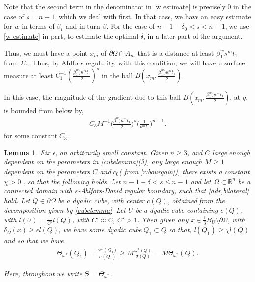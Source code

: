 \documentclass{article}
\newcounter{lem}
\theoremstyle{plain}
\theoremstyle{plain}
\newcommand{\eps}{\epsilon}
\newcommand{\en}{\beta_1}
\newtheorem{lemma}[theorem]{Lemma}
\theoremstyle{definition}
\theoremstyle{plain}
\begin{document}
Note that the second term in the denominator in \cref{w estimate} is precisely $0$ in the case of $s=n-1$, which we deal with first. In that case, we have an easy estimate for $w$ in terms of $\en$ and in turn $\beta$.  For the case of $n-1-\delta_0 <s<n-1$, we use \cref{w estimate} in part, to estimate the optimal $\delta$, in a later part of the argument.
 
      Thus, we must have  a point $x_m$ of $\partial\Omega\cap A_m$ that is a distance at least $\beta_1^w \kappa^m t_1$ from $\Sigma_1$. Thus, by Ahlfors regularity, with this condition, we will have a surface measure at least $C_{1}^{-1}(\frac{\beta_1^w)\kappa^m t_1}{2})^s$ in the ball $B(x_m, \frac{\beta_1^w)\kappa^m t_1}{2})$. 
 

      In this case, the magnitude of the gradient due to this ball $B(x_m, \frac{\beta_1^w)\kappa^m t_1}{2})$, at $q$, is bounded from below by, 
      \begin{align}\label{lowerbound}
          C_{3}M^{-1}\Big(\frac{\beta_1^w)\kappa^m t_1}{2}\Big)^s \Big(\frac{1}{\kappa^m t_1}\Big)^{n-1}.
      \end{align}
      for some constant $C_3$. 

  
     \begin{lemma}\label{lemma9}
Fix $\eps$, an arbitrarily small constant. Given $n\geq 3$, and $C$ large enough dependent on the parameters in \cref{cubelemma}(3), any large enough $M\geq 1$ dependent on the parameters $C$ and $c_0$( from \cref{r:bourgain}), there exists a constant $\chi>0$ , so that the following holds.
Let $n-1-\delta < s \leq n-1$ and let $\Omega \subset \mathbb{R}^{n}$ be a connected domain with $s$-Ahlfors-David regular boundary, such that
\cref{adr,bilateral} hold.
Let $Q\in \partial\Omega$ be a dyadic cube, with center $c(Q)$, obtained from the decomposition given by \cref{cubelemma}. Let  $U$ be a dyadic cube containing $c(Q)$, with $l(U)=\frac{1}{C'}l(Q)$, with $C'\approx C$, $C' >1$.  Then given any $x\in \frac{1}{3} B_U\setminus \partial\Omega$, with $\delta_\Omega(x)\geq \eps l(Q)$, we have some dyadic cube $Q_1\subset Q$ so that, $l(Q_1)\geq \chi l(Q)$ and so that we have 
\begin{align}\label{eq366}
   \Theta_{\omega^x}(Q_1)=\frac{\omega^{x}(Q_1)}{\sigma(Q_1)}\geq M\frac{\omega^x(Q)}{\sigma(Q)}=M\Theta_{\omega^x}(Q).
\end{align}

Here, throughout we write $\Theta=\Theta_{\omega^{x}}^{s}$.
\end{lemma}
      
\end{document}
